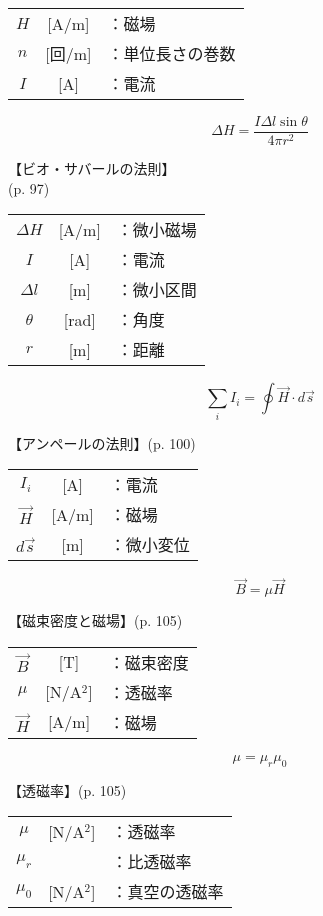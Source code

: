 \documentclass[10pt]{jarticle}
\begin{document}
\begin{tabular}{ccl}
$H$	&[A/m]	&：磁場 \\
$n$	&[回/m]	&：単位長さの巻数\\
$I$	&[A]	&：電流 \\
\end{tabular}





\newpage
\[
\mathit{\Delta} H = \frac{I \mathit{\Delta}l \sin\theta}{4\pi r^2}
\]


\vskip3mm
【ビオ・サバールの法則】\\
\hfill {\footnotesize (p. 97)}

\begin{tabular}{ccl}
$\mathit{\Delta} H$	&[A/m]	&：微小磁場 \\
$I$	&[A]	&：電流\\
$\mathit{\Delta} l$	&[m]	&：微小区間\\
$\theta$	&[rad]	&：角度\\
$r$	&[m]	&：距離
\end{tabular}




\newpage
\[
\sum_i I_i = \oint \vec{H} \cdot d \vec{s}
\]


\vskip3mm
【アンペールの法則】\hfill {\footnotesize (p. 100)}

\begin{tabular}{ccl}
$I_i$	&[A]	&：電流\\
$\vec{H}$	&[A/m]	&：磁場\\
$d \vec{s}$	&[m]	&：微小変位
\end{tabular}




\newpage
\[
\vec{B} = \mu \vec{H}
\]


\vskip3mm
【磁束密度と磁場】{\footnotesize (p. 105)}

\begin{tabular}{ccl}
$\vec{B}$	&[T]	&：磁束密度\\
$\mu$	&[N/A$^2$]	&：透磁率\\
$\vec{H}$	&[A/m]	&：磁場
\end{tabular}




\newpage
\[
\mu = \mu_r \mu_0
\]


\vskip3mm
【透磁率】{\footnotesize (p. 105)}

\begin{tabular}{ccl}
$\mu$	&[N/A$^2$]	&：透磁率\\
$\mu_r$	&	&：比透磁率\\
$\mu_0$	&[N/A$^2$]	&：真空の透磁率
\end{tabular}
\end{document}

